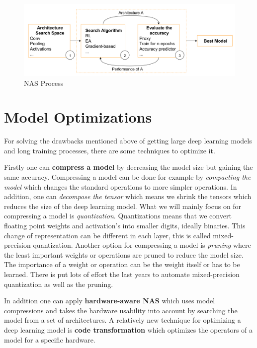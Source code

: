 \documentclass[conference]{IEEEtran}
\begin{document}
\begin{figure}[htbp]
\centerline{\includegraphics[width=\linewidth]{NASProcess.png}}
\caption{NAS Process\cite{bib1}}
\label{fig:NASProcess}
\end{figure}

\section{Model Optimizations}
\label{section:ModelOptimization}
For solving the drawbacks mentioned above of getting large deep learning models and long training processes, there are some techniques to optimize it.

Firstly one can \textbf{compress a model} by decreasing the model size but gaining the same accuracy. Compressing a model can be done for example by \textit{compacting the model} which changes the standard operations to more simpler operations. In addition, one can \textit{decompose the tensor} which means we shrink the tensors which reduces the size of the deep learning model. What we will mainly focus on for compressing a model is \textit{quantization}. Quantizations means that we convert floating point weights and activation's into smaller digits, ideally binaries. This change of representation can be different in each layer, this is called mixed-precision quantization. Another option for compressing a model is \textit{pruning} where the least important weights or operations are pruned to reduce the model size. The importance of a weight or operation can be the weight itself or has to be learned. There is put lots of effort the last years to automate mixed-precision quantization as well as the pruning. 

In addition one can apply \textbf{hardware-aware NAS} which uses model compressions and takes the hardware usability into account by searching the model from a set of architectures. A relatively new technique for optimizing a deep learning model is \textbf{code transformation} which optimizes the operators of a model for a specific hardware.
\end{document}
